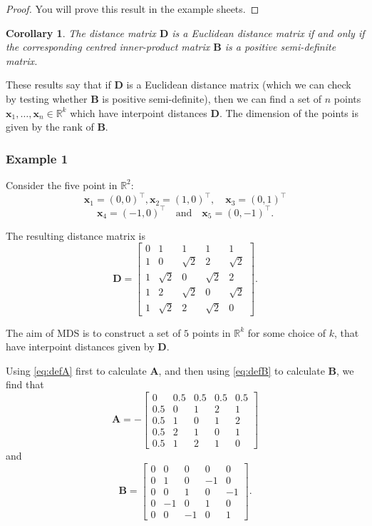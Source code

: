\documentclass[
]{book}
\newtheorem{corollary}{Corollary}[chapter]
\theoremstyle{definition}
\theoremstyle{definition}
\theoremstyle{definition}
\theoremstyle{definition}
\theoremstyle{remark}
\begin{document}
\begin{proof}
You will prove this result in the example sheets.
\end{proof}

\begin{corollary}
\protect\hypertarget{cor:unnamed-chunk-4}{}{\label{cor:unnamed-chunk-4} }The distance matrix \(\mathbf D\) is a Euclidean distance matrix if and only if the corresponding centred inner-product matrix \(\mathbf B\) is a positive semi-definite matrix.
\end{corollary}

These results say that if \(\mathbf D\) is a Euclidean distance matrix (which we can check by testing whether \(\mathbf B\) is positive semi-definite), then we can find a set of \(n\) points \(\mathbf x_1, \ldots, \mathbf x_n\in \mathbb{R}^k\) which have interpoint distances \(\mathbf D\). The dimension of the points is given by the rank of \(\mathbf B\).

\hypertarget{example-1}{%
\subsubsection*{Example 1}\label{example-1}}

Consider the five point in \(\mathbb{R}^2\):
\[
\mathbf x_1=(0,0)^\top,  \mathbf x_2 =(1,0)^\top, \quad \mathbf x_3 =(0,1)^\top
\]
\[
\mathbf x_4 =(-1,0)^\top \quad \text{and} \quad \mathbf x_5=(0,-1)^\top.
\]

The resulting distance matrix is
\[
\mathbf D=\left [ \begin{array}{ccccc}
0&1&1&1&1\\
1&0&\sqrt{2}&2&\sqrt{2}\\
1&\sqrt{2}&0&\sqrt{2}&2\\
1&2&\sqrt{2}&0&\sqrt{2}\\
1&\sqrt{2}&2&\sqrt{2}&0
\end{array} \right ].
\]

The aim of MDS is to construct a set of \(5\) points in \(\mathbb{R}^k\) for some choice of \(k\), that have interpoint distances given by \(\mathbf D\).

Using \eqref{eq:defA} first to calculate \(\mathbf A\), and then using \eqref{eq:defB} to calculate \(\mathbf B\), we find that
\[
\mathbf A=-\left [ \begin{array}{ccccc}
0&0.5&0.5&0.5&0.5\\
0.5&0&1&2&1\\
0.5&1&0&1&2\\
0.5&2&1&0&1\\
0.5&1&2&1&0
\end{array} \right ]
\]
and
\[
\mathbf B=\left [ \begin{array}{ccccc}
 0& 0&0&0&0\\
0&1&0&-1&0\\
0&0&1&0&-1\\
0&-1&0&1&0\\
0&0&-1&0&1
\end{array} \right ].
\]
\end{document}
